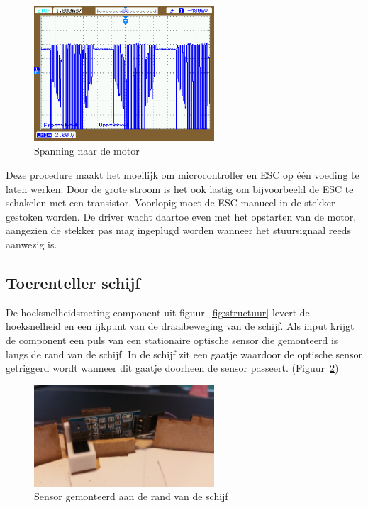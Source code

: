 \documentclass[12pt]{ugentreport}
\begin{document}
\begin{figure}
  \centering
  \includegraphics[width=0.6\textwidth]{img/scoopesc.png}
  \caption{Spanning naar de motor}
  \label{fig:motoresc}
\end{figure}

Deze procedure maakt het moeilijk om microcontroller en ESC op één voeding te
laten werken. Door de grote stroom is het ook lastig om bijvoorbeeld de ESC te
schakelen met een transistor. Voorlopig moet de ESC manueel in de stekker
gestoken worden. De driver wacht daartoe even met het opstarten van de motor,
aangezien de stekker pas mag ingeplugd worden wanneer het stuursignaal reeds
aanwezig is.

\subsection{Toerenteller schijf}
De hoeksnelheidsmeting component uit figuur~\ref{fig:structuur} levert de hoeksnelheid en een
ijkpunt van de draaibeweging van de schijf. Als input krijgt de component een
puls van een stationaire optische sensor die gemonteerd is langs de rand van de
schijf. In de schijf zit een gaatje waardoor de optische sensor getriggerd wordt
wanneer dit gaatje doorheen de sensor passeert. (Figuur~\ref{fig:sensor})

\begin{figure}
  \centering
  \includegraphics[width=0.6\textwidth]{img/Sensor.jpg}
  \caption{Sensor gemonteerd aan de rand van de schijf}
  \label{fig:sensor}
\end{figure}
\end{document}
